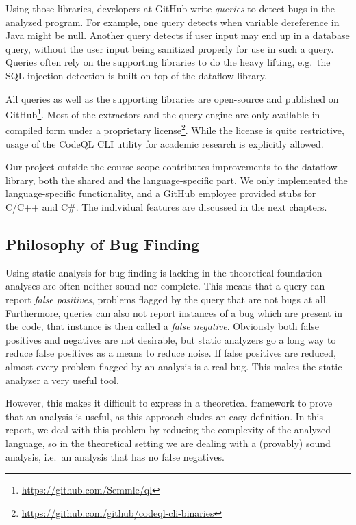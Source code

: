 Using those libraries, developers at GitHub write \emph{queries} to detect bugs in the analyzed program.
For example, one query detects when variable dereference in Java might be null.
Another query detects if user input may end up in a database query, without the user input being 
sanitized properly for use in such a query.
Queries often rely on the supporting libraries to do the heavy lifting, e.g.\ the SQL injection detection 
is built on top of the dataflow library.

All queries as well as the supporting libraries are open-source and published 
on GitHub\footnote{\url{https://github.com/Semmle/ql}}.
Most of the extractors and the query engine are only available in compiled form under a 
proprietary license\footnote{\url{https://github.com/github/codeql-cli-binaries}}.
While the license is quite restrictive,
usage of the CodeQL CLI utility for academic research is explicitly allowed.

Our project outside the course scope contributes improvements to the dataflow library,
both the shared and the language-specific part. We only implemented the language-specific 
functionality, and a GitHub employee provided stubs for C/C++ and C\#.
The individual features are discussed in the next chapters.


\subsection{Philosophy of Bug Finding}
Using static analysis for bug finding is lacking in the theoretical foundation {---} 
analyses are often neither sound nor complete.
This means that a query can report \emph{false positives}, problems flagged by the query that 
are not bugs at all.
Furthermore, queries can also not report instances of a bug which are present in the code,
that instance is then called a \emph{false negative}.
Obviously both false positives and negatives are not desirable, but static analyzers go a long way
to reduce false positives as a means to reduce noise.
If false positives are reduced, almost every problem flagged by an analysis is a real bug.
This makes the static analyzer a very useful tool.

However, this makes it difficult to express in a theoretical framework to prove that 
an analysis is useful, as this approach eludes an easy definition.
In this report, we deal with this problem by reducing the complexity of the analyzed language,
so in the theoretical setting we are dealing with a (provably) sound analysis, i.e.\ 
an analysis that has no false negatives.


